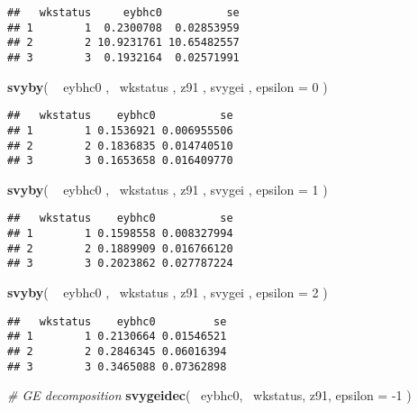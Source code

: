 \documentclass[]{book}
\newenvironment{Shaded}{\begin{snugshade}}{\end{snugshade}}
\newcommand{\KeywordTok}[1]{\textcolor[rgb]{0.13,0.29,0.53}{\textbf{{#1}}}}
\newcommand{\DataTypeTok}[1]{\textcolor[rgb]{0.13,0.29,0.53}{{#1}}}
\newcommand{\DecValTok}[1]{\textcolor[rgb]{0.00,0.00,0.81}{{#1}}}
\newcommand{\StringTok}[1]{\textcolor[rgb]{0.31,0.60,0.02}{{#1}}}
\newcommand{\CommentTok}[1]{\textcolor[rgb]{0.56,0.35,0.01}{\textit{{#1}}}}
\newcommand{\NormalTok}[1]{{#1}}
\begin{document}
\begin{verbatim}
##   wkstatus     eybhc0          se
## 1        1  0.2300708  0.02853959
## 2        2 10.9231761 10.65482557
## 3        3  0.1932164  0.02571991
\end{verbatim}

\begin{Shaded}
\begin{Highlighting}[]
\KeywordTok{svyby}\NormalTok{( ~}\StringTok{ }\NormalTok{eybhc0 , ~wkstatus , z91 , svygei , }\DataTypeTok{epsilon =} \DecValTok{0} \NormalTok{)}
\end{Highlighting}
\end{Shaded}

\begin{verbatim}
##   wkstatus    eybhc0          se
## 1        1 0.1536921 0.006955506
## 2        2 0.1836835 0.014740510
## 3        3 0.1653658 0.016409770
\end{verbatim}

\begin{Shaded}
\begin{Highlighting}[]
\KeywordTok{svyby}\NormalTok{( ~}\StringTok{ }\NormalTok{eybhc0 , ~wkstatus , z91 , svygei , }\DataTypeTok{epsilon =} \DecValTok{1} \NormalTok{)}
\end{Highlighting}
\end{Shaded}

\begin{verbatim}
##   wkstatus    eybhc0          se
## 1        1 0.1598558 0.008327994
## 2        2 0.1889909 0.016766120
## 3        3 0.2023862 0.027787224
\end{verbatim}

\begin{Shaded}
\begin{Highlighting}[]
\KeywordTok{svyby}\NormalTok{( ~}\StringTok{ }\NormalTok{eybhc0 , ~wkstatus , z91 , svygei , }\DataTypeTok{epsilon =} \DecValTok{2} \NormalTok{)}
\end{Highlighting}
\end{Shaded}

\begin{verbatim}
##   wkstatus    eybhc0         se
## 1        1 0.2130664 0.01546521
## 2        2 0.2846345 0.06016394
## 3        3 0.3465088 0.07362898
\end{verbatim}

\begin{Shaded}
\begin{Highlighting}[]
\CommentTok{# GE decomposition}
\KeywordTok{svygeidec}\NormalTok{( ~eybhc0, ~wkstatus, z91, }\DataTypeTok{epsilon =} \NormalTok{-}\DecValTok{1} \NormalTok{)}
\end{Highlighting}
\end{Shaded}
\end{document}
